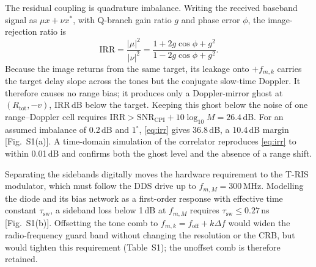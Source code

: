 \documentclass[journal]{IEEEtran}
\newcommand{\Tris}{T-RIS}
\begin{document}
The residual coupling is quadrature imbalance. Writing the received baseband signal as $\mu x + \nu x^{*}$, with Q-branch gain ratio $g$ and phase error $\phi$, the image-rejection ratio is
\begin{equation}
\mathrm{IRR} = \frac{|\mu|^2}{|\nu|^2} = \frac{1+2g\cos\phi+g^2}{1-2g\cos\phi+g^2}.
\label{eq:irr}
\end{equation}
Because the image returns from the same target, its leakage onto $+f_{m,k}$ carries the target delay slope across the tones but the conjugate slow-time Doppler. It therefore causes no range bias; it produces only a Doppler-mirror ghost at $(R_{\mathrm{tot}}, -v)$, $\mathrm{IRR}$\,dB below the target. Keeping this ghost below the noise of one range--Doppler cell requires $\mathrm{IRR} > \mathrm{SNR}_{\mathrm{CPI}} + 10\log_{10}M = 26.4$\,dB. For an assumed imbalance of 0.2\,dB and $1^\circ$, \eqref{eq:irr} gives 36.8\,dB, a 10.4\,dB margin [Fig.~S1(a)]. A time-domain simulation of the correlator reproduces \eqref{eq:irr} to within 0.01\,dB and confirms both the ghost level and the absence of a range shift.

Separating the sidebands digitally moves the hardware requirement to the \Tris{} modulator, which must follow the DDS drive up to $f_{m,M} = 300$\,MHz. Modelling the diode and its bias network as a first-order response with effective time constant $\tau_{\mathrm{sw}}$, a sideband loss below 1\,dB at $f_{m,M}$ requires $\tau_{\mathrm{sw}} \le 0.27$\,ns [Fig.~S1(b)]. Offsetting the tone comb to $f_{m,k} = f_{\mathrm{off}} + k\Delta f$ would widen the radio-frequency guard band without changing the resolution or the CRB, but would tighten this requirement (Table~S1); the unoffset comb is therefore retained.
\end{document}
